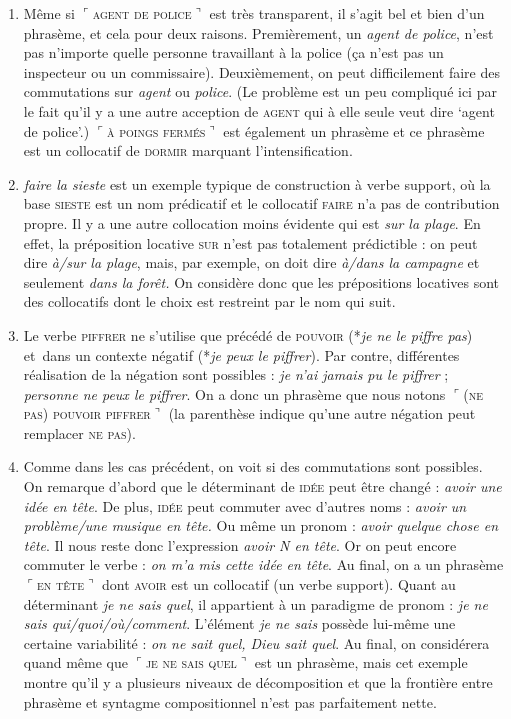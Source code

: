 {    
    \begin{enumerate}
    \item  Même si \textrm{$⌜$}\textsc{agent} \textsc{de} \textsc{police}\textrm{$⌝$} est très transparent, il s’agit bel et bien d’un phrasème, et cela pour deux raisons. Premièrement, un \textit{agent de police}, n’est pas n’importe quelle personne travaillant à la police (ça n’est pas un inspecteur ou un commissaire). Deuxièmement, on peut difficilement faire des commutations sur \textit{agent} ou \textit{police}. (Le problème est un peu compliqué ici par le fait qu’il y a une autre acception de \textsc{agent} qui à elle seule veut dire ‘agent de police’.) \textrm{$⌜$}\textsc{à} \textsc{poings} \textsc{fermés}\textrm{$⌝$} est également un phrasème et ce phrasème est un collocatif de \textsc{dormir} marquant l’intensification.
    \item  \textit{faire la sieste} est un exemple typique de construction à verbe support, où la base \textsc{sieste} est un nom prédicatif et le collocatif \textsc{faire} n’a pas de contribution propre. Il y a une autre collocation moins évidente qui est \textit{sur la plage}. En effet, la préposition locative \textsc{sur} n’est pas totalement prédictible : on peut dire \textit{à/sur la plage}, mais, par exemple, on doit dire \textit{à/dans la campagne} et seulement \textit{dans la forêt.} On considère donc que les prépositions locatives sont des collocatifs dont le choix est restreint par le nom qui suit.
    \item  Le verbe \textsc{piffrer} ne s’utilise que précédé de \textsc{pouvoir} (*\textit{je ne le piffre pas}) et~dans un contexte négatif (*\textit{je peux le piffrer}). Par contre, différentes réalisation de la négation sont possibles : \textit{je n’ai jamais pu le piffrer} ; \textit{personne ne peux le piffrer}. On a donc un phrasème que nous notons \textrm{$⌜$}\textsc{(ne} \textsc{pas)} \textsc{pouvoir} \textsc{piffrer}\textrm{$⌝$} (la parenthèse indique qu’une autre négation peut remplacer \textsc{ne} \textsc{pas}).
    \item  Comme dans les cas précédent, on voit si des commutations sont possibles. On remarque d’abord que le déterminant de \textsc{idée} peut être changé : \textit{avoir une idée en tête}. De plus, \textsc{idée} peut commuter avec d’autres noms : \textit{avoir un problème/une musique en tête.} Ou même un pronom : \textit{avoir quelque chose en tête}. Il nous reste donc l’expression \textit{avoir N en tête}. Or on peut encore commuter le verbe : \textit{on m’a mis cette idée en tête}. Au final, on a un phrasème \textrm{$⌜$}\textsc{en} \textsc{tête}\textrm{$⌝$} dont \textsc{avoir} est un collocatif (un verbe support). Quant au déterminant \textit{je ne sais quel}, il appartient à un paradigme de pronom : \textit{je ne sais qui/quoi/où/comment}. L’élément \textit{je ne sais} possède lui-même une certaine variabilité : \textit{on ne sait quel, Dieu sait quel}. Au final, on considérera quand même que \textrm{$⌜$}\textsc{je} \textsc{ne} \textsc{sais} \textsc{quel}\textrm{$⌝$} est un phrasème, mais cet exemple montre qu’il y a plusieurs niveaux de décomposition et que la frontière entre phrasème et syntagme compositionnel n’est pas parfaitement nette.
    \end{enumerate}

}
